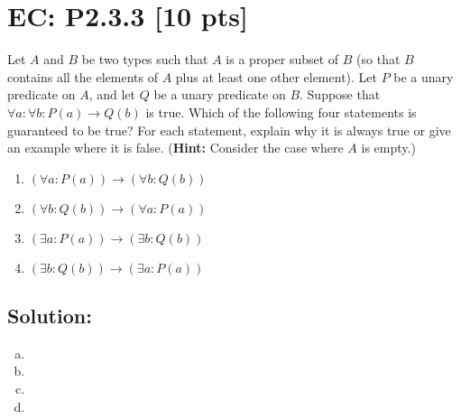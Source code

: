 \documentclass[12pt]{article}
\begin{document}
\newpage
\section*{\textbf{EC: P2.3.3} [10 pts]}
Let $A$ and $B$ be two types such that $A$ is a proper subset of $B$ (so that $B$ contains all the elements of $A$ plus at least one other element). Let $P$ be a unary predicate on $A$, and let $Q$ be a unary predicate on $B$. Suppose that $\forall a : \forall b : P(a) \rightarrow Q(b)$ is true. Which of the following four statements is guaranteed to be true? For each statement, explain why it is always true or give an example where it is false. (\textbf{Hint:} Consider the case where $A$ is empty.)

\begin{enumerate}[label=(\alph*)]
    \item $( \forall a: P(a)) \rightarrow (\forall b: Q(b))$
    \item $( \forall b: Q(b)) \rightarrow (\forall a: P(a))$
    \item $( \exists a: P(a)) \rightarrow (\exists b: Q(b))$
    \item $( \exists b: Q(b)) \rightarrow (\exists a: P(a))$
\end{enumerate}

\subsection*{\textbf{Solution:}}
\begin{enumerate}[(a)]
    \item 

    \item

    \item 

    \item 
    
\end{enumerate}
\end{document}
